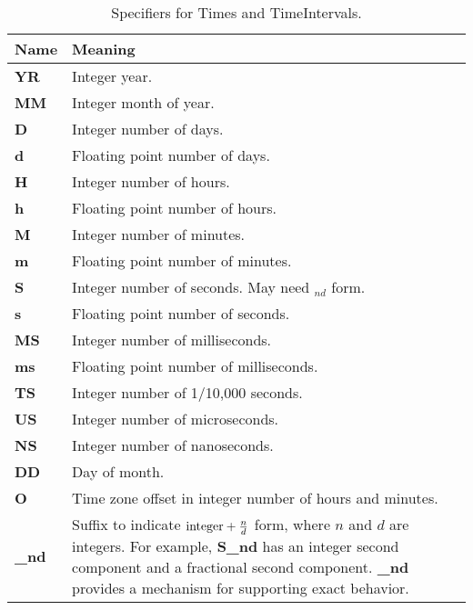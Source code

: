 \newpage
\begin{center}
\begin{table}
\caption{\label{time-abbrevs}Specifiers for Times and TimeIntervals.}
\begin{tabular}{|p{1in}|p{3.5in}|}
\hline
Name & Meaning \\
\hline\hline
{\bf YR} & Integer year. \\
\hline
{\bf MM} & Integer month of year. \\
\hline
{\bf D} & Integer number of days. \\
\hline
{\bf d} & Floating point number of days. \\
\hline
{\bf H} & Integer number of hours. \\
\hline
{\bf h} & Floating point number of hours. \\
\hline
{\bf M} & Integer number of minutes. \\
\hline
{\bf m} & Floating point number of minutes. \\
\hline
{\bf S} & Integer number of seconds. May need $_{nd}$ form.\\
\hline
{\bf s} & Floating point number of seconds. \\
\hline
{\bf MS} & Integer number of milliseconds. \\
\hline
{\bf ms} & Floating point number of milliseconds. \\
\hline
{\bf TS} & Integer number of 1/10,000 seconds. \\
\hline
{\bf US} & Integer number of microseconds. \\
\hline
{\bf NS} & Integer number of nanoseconds. \\
\hline
{\bf DD} & Day of month. \\
\hline
{\bf O} & Time zone offset in integer number of hours and minutes. \\
\hline
{\bf \_nd} & Suffix to indicate {\bf $ {\rm integer} + \frac{n}{d}$} form,
where $n$ and $d$ are integers. For example, {\bf S\_nd} has an integer
second component and a fractional second component. {\bf \_nd} provides 
a mechanism for supporting exact behavior.
\\
\hline
\end{tabular}
\end{table}
\end{center}






